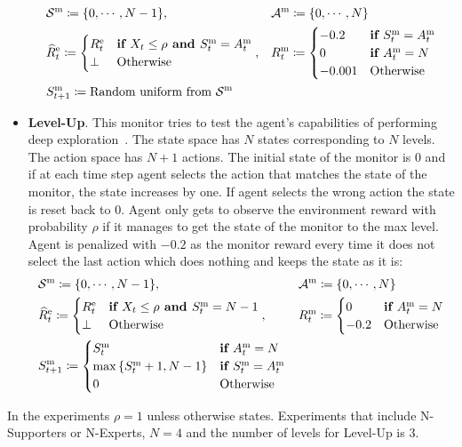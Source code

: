 \begin{itemize}[leftmargin=*]
    \begin{align*}
        &\mathcal{S}^\text{m} \coloneq \{0, \cdots, N - 1\}, 
        && \mathcal{A}^\text{m} \coloneq \{0, \cdots, N\} \\
        & \widehat{R}^\text{e}_t \coloneq 
        \begin{cases}
        R^\text{e}_t & \textbf{if } X_t \leq \rho \textbf{ and } S^\text{m}_t = A^\text{m}_t\\
        \bot & \text{Otherwise}
        \end{cases},
        && R^\text{m}_t \coloneq 
        \begin{cases}
        -0.2 &  \textbf{if } S^\text{m}_t = A^\text{m}_t\\
        0 &  \textbf{if } A^\text{m}_t = N\\
        -0.001 & \text{Otherwise}
        \end{cases} \\
        & S^\text{m}_{t + 1} \coloneq \text{Random uniform from } \mathcal{S}^\text{m}
    \end{align*}
    \item \textbf{Level-Up}. This monitor tries to test the agent's capabilities of performing deep exploration~\citep{osband2019deep}. The state space has $N$ states corresponding to $N$ levels. The action space has $N + 1$ actions. The initial state of the monitor is 0 and if at each time step agent selects the action that matches the state of the monitor, the state increases by one. If agent selects the wrong action the state is reset back to 0. Agent only gets to observe the environment reward with probability $\rho$ if it manages to get the state of the monitor to the max level. Agent is penalized with $-0.2$ as the monitor reward every time it does not select the last action which does nothing and keeps the state as it is:
    \begin{align*}
        &\mathcal{S}^\text{m} \coloneq \{0, \cdots, N - 1\}, 
        && \mathcal{A}^\text{m} \coloneq \{0, \cdots, N\} \\
        & \widehat{R}^\text{e}_t \coloneq 
        \begin{cases}
        R^\text{e}_t & \textbf{if } X_t \leq \rho \textbf{ and } S^\text{m}_t = N - 1 \\
        \bot & \text{Otherwise}
        \end{cases},
        && R^\text{m}_t \coloneq 
        \begin{cases}
        0 &  \textbf{if } A^\text{m}_t = N \\
        -0.2 & \text{Otherwise}
        \end{cases} \\
        & S^\text{m}_{t + 1} \coloneq
        \begin{cases}
            S^\text{m}_t & \textbf{if } A^\text{m}_t = N \\
            \max\left\{ S^\text{m}_t + 1, N - 1 \right\} & \textbf{if } S^\text{m}_t = A^\text{m}_t \\
            0 & \text{Otherwise}
        \end{cases}
    \end{align*}
\end{itemize}
In the experiments $\rho = 1$ unless otherwise states. Experiments that include N-Supporters or N-Experts, $N = 4$ and the number of levels for Level-Up is 3.

